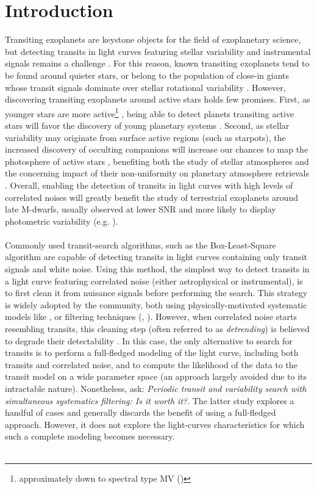 \documentclass{aastex631}
\begin{document}
\section*{Introduction}
Transiting exoplanets are keystone objects for the field of exoplanetary science, but detecting transits in light curves featuring stellar variability and instrumental signals remains a challenge \citep{Pont2006,Howell2016}. For this reason, known transiting exoplanets tend to be found around quieter stars, or belong to the population of close-in giants whose transit signals dominate over stellar rotational variability \citep{Simpson2023}. However, discovering transiting exoplanets around active stars holds few promises. First, as younger stars are more active\footnote{approximately down to spectral type MV ()} \citep{Skumanich1972}, being able to detect planets transiting active stars will favor the discovery of young planetary systems \citep[e.g.][]{Newton2022}. Second, as stellar variability may originate from surface active regions (such as starpots), the increased discovery of occulting companions will increase our chances to map the photosphere of active stars \citep[e.g.][]{Morris2017}, benefiting both the study of stellar atmospheres and the concerning impact of their non-uniformity on planetary atmosphere retrievals \citep{rackham2018}. Overall, enabling the detection of transits in light curves with high levels of correlated noises will greatly benefit the study of terrestrial exoplanets around late M-dwarfs, usually observed at lower SNR and more likely to display photometric variability (e.g. \citealt{Murray2020}).
\\\\
Commonly used transit-search algorithms, such as the Box-Least-Square algorithm \citep[BLS,][]{bls} are capable of detecting transits in light curves containing only transit signals and white noise. Using this method, the simplest way to detect transits in a light curve featuring correlated noise (either astrophysical or instrumental), is to first clean it from nuisance signals before performing the search. This strategy is widely adopted by the community, both using physically-motivated systematic models like \cite{everest1, everest2}, or filtering techniques (\citealt{Jenkins2010}, \citealt{wotan}). However, when correlated noise starts resembling transits, this cleaning step (often referred to as \textit{detrending}) is believed to degrade their detectability \cite[see subsection 4.3 of][]{wotan}. In this case, the only alternative to search for transits is to perform a full-fledged modeling of the light curve, including both transits and correlated noise, and to compute the likelihood of the data to the transit model on a wide parameter space (an approach largely avoided due to its intractable nature). Nonetheless, \cite{kovacs2016} ask: \textit{Periodic transit and variability search with simultaneous systematics filtering: Is it worth it?}. The latter study explores a handful of cases and generally discards the benefit of using a full-fledged approach. However, it does not explore the light-curves characteristics for which such a complete modeling becomes necessary.\\\\
\end{document}
